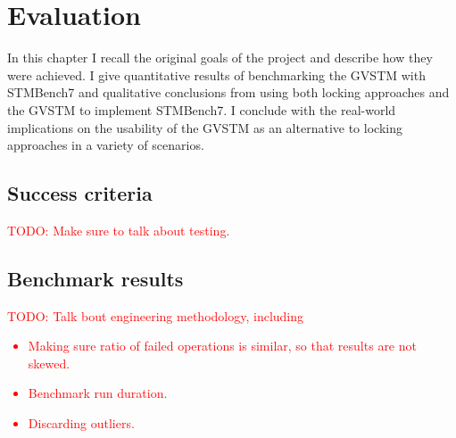 \documentclass[12pt,a4paper,oneside,openright]{report}
\newcommand{\mycaption}[2]{\caption[#1]{#1 #2}}
\newcommand{\todo}[1]{\textcolor{red}{TODO: #1}}
\begin{document}




\chapter{Evaluation}

In this chapter I recall the original goals of the project and
describe how they were achieved. I give quantitative results of
benchmarking the GVSTM with STMBench7 and qualitative conclusions from
using both locking approaches and the GVSTM to implement STMBench7. I
conclude with the real-world implications on the usability of the
GVSTM as an alternative to locking approaches in a variety of
scenarios.

\section{Success criteria}
\label{sec:eval:success-criteria}

\todo{Make sure to talk about testing.}

\section{Benchmark results}
\label{sec:eval:benchmark-results}

\todo{Talk bout engineering methodology, including
  \begin{itemize}
  \item Making sure ratio of failed operations is similar, so that
    results are not skewed.
  \item Benchmark run duration.
  \item Discarding outliers.
  \end{itemize}
}
\end{document}

